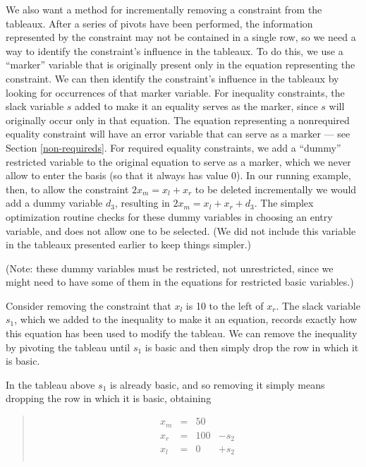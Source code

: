 \documentclass{article}
\begin{document}
We also want a method for incrementally removing a constraint from the
tableaux.  After a series of pivots have been performed, the information
represented by the constraint may not be contained in a single row, so we
need a way to identify the constraint's influence in the tableaux.  To do
this, we use a ``marker'' variable that is originally present only in the
equation representing the constraint.  We can then identify the
constraint's influence in the tableaux by looking for occurrences of that
marker variable.  For inequality constraints, the slack variable $s$ added
to make it an equality serves as the marker, since $s$ will originally
occur only in that equation.  The equation representing a nonrequired
equality constraint will have an error variable that can serve as a marker
--- see Section \ref{non-requireds}.  For required equality constraints, we
add a ``dummy'' restricted variable to the original equation to serve as a
marker, which we never allow to enter the basis (so that it always has
value 0).  In our running example, then, to allow the constraint $2 x_m =
x_l + x_r$ to be deleted incrementally we would add a dummy variable $d_3$,
resulting in $2 x_m = x_l + x_r + d_3$.  The simplex optimization routine
checks for these dummy variables in choosing an entry variable, and does
not allow one to be selected.  (We did not include this variable in the
tableaux presented earlier to keep things simpler.)

(Note: these dummy variables must be restricted, not unrestricted, since we
might need to have some of them in the equations for restricted basic
variables.)

Consider removing the constraint that $x_l$ is 10 to the left of $x_r$.
The slack variable $s_1$, which we added to the inequality to make it
an equation, records exactly how this equation has been used to modify the
tableau.  We can remove the inequality by pivoting the tableau until 
$s_1$ is basic and then simply drop the row in which it is basic.

In the tableau above $s_1$ is already basic, and so removing it simply means
dropping the row in which it is basic, obtaining
\begin{quote}\vspace*{-1ex}
$$
\begin{array}{rlrrr} 
x_m & = &50   \\
x_r & = &100 & - s_2 \\ \hline
x_l & = &0 & + s_2 \\

\end{array}
$$
\end{quote}\vspace{-0.9ex}
\end{document}
